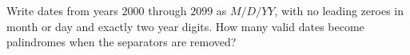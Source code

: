 Write dates from years $2000$ through $2099$ as $M/D/YY$, with no leading zeroes in month or day and exactly two year digits. How many valid dates become palindromes when the separators are removed?
